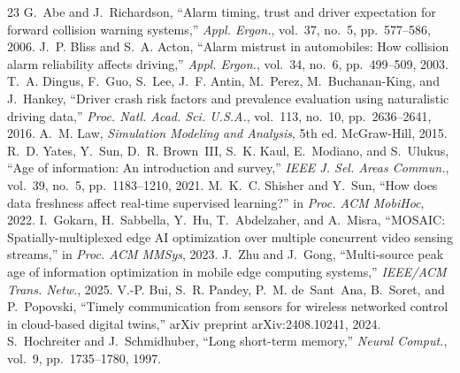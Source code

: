 \documentclass[conference]{IEEEtran}
\begin{document}
\begin{thebibliography}{23}
 G.~Abe and J.~Richardson, ``Alarm timing, trust
and driver expectation for forward collision warning systems,''
\emph{Appl. Ergon.}, vol.~37, no.~5, pp.~577--586, 2006.
 J.~P. Bliss and S.~A. Acton, ``Alarm mistrust in
automobiles: How collision alarm reliability affects driving,''
\emph{Appl. Ergon.}, vol.~34, no.~6, pp.~499--509, 2003.
 T.~A. Dingus, F.~Guo, S.~Lee, J.~F. Antin,
M.~Perez, M.~Buchanan-King, and J.~Hankey, ``Driver crash risk factors
and prevalence evaluation using naturalistic driving data,'' \emph{Proc.
Natl. Acad. Sci. U.S.A.}, vol.~113, no.~10, pp.~2636--2641, 2016.
 A.~M. Law, \emph{Simulation Modeling and Analysis},
5th ed. McGraw-Hill, 2015.
 R.~D. Yates, Y.~Sun, D.~R. Brown~III, S.~K. Kaul,
E.~Modiano, and S.~Ulukus, ``Age of information: An introduction and
survey,'' \emph{IEEE J. Sel. Areas Commun.}, vol.~39, no.~5,
pp.~1183--1210, 2021.
 M.~K.~C. Shisher and Y.~Sun, ``How does
data freshness affect real-time supervised learning?'' in \emph{Proc.
ACM MobiHoc}, 2022.
 I.~Gokarn, H.~Sabbella, Y.~Hu,
T.~Abdelzaher, and A.~Misra, ``MOSAIC: Spatially-multiplexed edge AI
optimization over multiple concurrent video sensing streams,'' in
\emph{Proc. ACM MMSys}, 2023.
J.~Zhu and J.~Gong,
``Multi-source peak age of information optimization in mobile edge
computing systems,'' \emph{IEEE/ACM Trans. Netw.}, 2025.
 V.-P. Bui, S.~R. Pandey, P.~M. de~Sant~Ana,
B.~Soret, and P.~Popovski, ``Timely communication from sensors for
wireless networked control in cloud-based digital twins,'' arXiv
preprint arXiv:2408.10241, 2024.
 S.~Hochreiter and J.~Schmidhuber, ``Long
short-term memory,'' \emph{Neural Comput.}, vol.~9, pp.~1735--1780,
1997.
\end{thebibliography}
\end{document}
